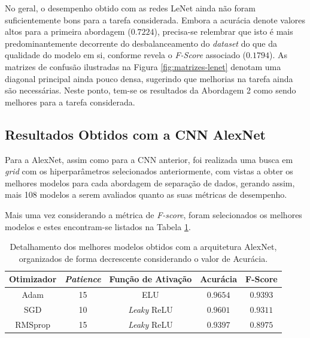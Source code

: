 No geral, o desempenho obtido com as redes LeNet ainda não foram suficientemente bons para a tarefa considerada. Embora a acurácia denote valores altos para a primeira abordagem ($0.7224$), precisa-se relembrar que isto é mais predominantemente decorrente do desbalanceamento do \emph{dataset} do que da qualidade do modelo em si, conforme revela o \emph{F-Score} associado ($0.1794$). As matrizes de confusão ilustradas na Figura \ref{fig:matrizes-lenet} denotam uma diagonal principal ainda pouco densa, sugerindo que melhorias na tarefa ainda são necessárias. Neste ponto, tem-se os resultados da Abordagem 2 como sendo melhores para a tarefa considerada.



\subsection{Resultados Obtidos com a CNN AlexNet}
\label{sec:alexnet}

 Para a AlexNet, assim como para a CNN anterior, foi realizada uma busca em \emph{grid} com os hiperparâmetros selecionados anteriormente, com vistas a obter os melhores modelos para cada abordagem de separação de dados, gerando assim, mais 108 modelos a serem avaliados quanto as suas métricas de desempenho.

 Mais uma vez considerando a métrica de \emph{F-score}, foram selecionados os melhores modelos e estes encontram-se listados na Tabela \ref{tab:alexnet}.

 \begin{table}[h!]
 \centering
 \caption{Detalhamento dos melhores modelos obtidos com a arquitetura AlexNet, organizados de forma decrescente considerando o valor de Acurácia.}
 \label{tab:alexnet}
 \begin{tabular}{ccccc}
 \toprule
 \textbf{Otimizador} & \textbf{\emph{Patience}}  & \textbf{Função de Ativação} & \textbf{Acurácia} & \textbf{F-Score} \\
 \midrule
 Adam & 15 & ELU & $0.9654$ & $0.9393$ \\
 SGD & 10 & \emph{Leaky} ReLU & $0.9601$ & $0.9311$ \\
 RMSprop & 15 & \emph{Leaky} ReLU & $0.9397$ & $0.8975$ \\
 \bottomrule
 \end{tabular}
\end{table}


